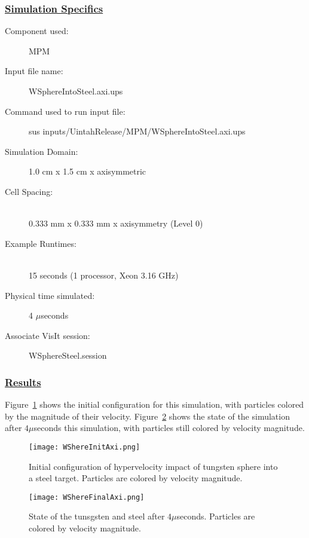 \subsubsection*{\underline{Simulation Specifics}}
\begin{description}
\item [Component used:] \hfill MPM
\item [Input file name:] \hfill WSphereIntoSteel.axi.ups
\item [Command used to run input file:]\hfill sus inputs/UintahRelease/MPM/WSphereIntoSteel.axi.ups
\item [Simulation Domain:]\hfill 1.0 cm x 1.5 cm x axisymmetric

\item [Cell Spacing:]\hfill \\
  0.333 mm x 0.333 mm x axisymmetry (Level 0)

\item [Example Runtimes:] \hfill \\
 15 seconds  (1 processor, Xeon 3.16 GHz)\\

\item [Physical time simulated:] \hfill 4 $\mu$seconds

\item [Associate VisIt session:] \hfill WSphereSteel.session

\end{description}

\subsubsection*{\underline{Results}}

Figure~\ref{fig:WSphereSteelInit} shows the initial configuration for
this simulation, with particles colored by the magnitude of their velocity.
Figure~\ref{fig:WSphereSteelFinal} shows the state of the simulation after
$4 \mu$seconds this simulation, with particles still colored by velocity
magnitude.

\begin{figure}
  \center
  \texttt{[image: WShereInitAxi.png]}
  \caption{Initial configuration of hypervelocity impact of tungsten sphere
           into a steel target.  Particles are
           colored by velocity magnitude.}
  \label{fig:WSphereSteelInit}
\end{figure}
\newpage
\begin{figure}
  \center
  \texttt{[image: WShereFinalAxi.png]}
  \caption{State of the tunsgsten and steel after $4 \mu$seconds.
           Particles are colored by velocity magnitude.}
  \label{fig:WSphereSteelFinal}
\end{figure}




